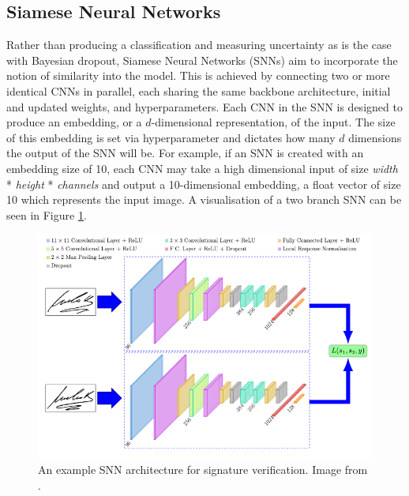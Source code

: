 \subsection{Siamese Neural Networks}\label{ch:ID,sec:deciding,sub:SNN}

Rather than producing a classification and measuring uncertainty as is the case with Bayesian dropout, Siamese Neural Networks (SNNs) aim to incorporate the notion of similarity into the model. This is achieved by connecting two or more identical CNNs in parallel, each sharing the same backbone architecture, initial and updated weights, and hyperparameters. Each CNN in the SNN is designed to produce an embedding, or a $d$-dimensional representation, of the input. The size of this embedding is set via hyperparameter and dictates how many $d$ dimensions the output of the SNN will be. For example, if an SNN is created with an embedding size of 10, each CNN may take a high dimensional input of size \textit{width} * \textit{height} * \textit{channels} and output a 10-dimensional embedding, a float vector of size 10 which represents the input image. A visualisation of a two branch SNN can be seen in Figure \ref{fig:signet-SNN-architecture}.

\begin{figure}
	\begin{center}
		\includegraphics[scale=0.4]{Chapter5/figs/signet-SNN-architecture.png}
	\end{center}
	\caption[An example SNN architecture for signature verification.]{An example SNN architecture for signature verification. Image from \cite{dey_signet_2017}.}
	\label{fig:signet-SNN-architecture}
\end{figure}

